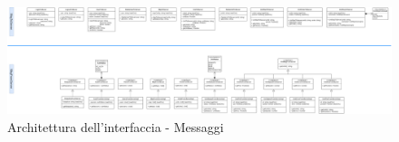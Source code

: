 \begin{landscape}
	\begin{figure}[h!]
		\includegraphics[width=24cm]{img/ui_messaggi.png}
		\caption{Architettura dell'interfaccia - Messaggi}
	\end{figure}
\end{landscape}
